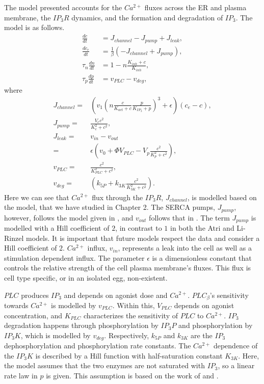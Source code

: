 The model presented accounts for the $Ca^{2+}$ fluxes across the ER and plasma membrane, the $IP_3R$ dynamics, and the formation and degradation of $IP_3$. The model is as follows.
\begin{align}
    \frac{dc}{dt}&=J_{channel}-J_{pump}+J_{leak},\\
    \frac{dc_e}{dt}&=\frac{1}{\beta}(-J_{channel}+J_{pump}),\\
    \tau_n\frac{dn}{dt}&=1-n\frac{K_{inh}+c}{K_{inh}},\\
    \tau_p\frac{dp}{dt}&=v_{PLC}-v_{deg},
\end{align}
where
\begin{align}
    J_{channel}=&\left(v_1\left(n\frac{c}{K_{act}+c}\frac{p}{K_{IP_3}+p}\right)^3+\epsilon\right)(c_e-c),\nonumber\\
    J_{pump}=&\frac{V_ec^2}{K_e^2+c^2},\nonumber\\
    J_{leak}=&v_{in}-v_{out}\nonumber\\
    =&\epsilon \left(v_0+\Phi V_{PLC}-V_{p}\frac{c^2}{K_{p}^2+c^2}\right),\nonumber\\
    v_{PLC}=&\frac{c^2}{K_{PLC}^2+c^2},\nonumber\\
    v_{deg}=&\left(k_{5P}+k_{3K}\frac{c^2}{K_{3K}^2+c^2}\right).\nonumber
\end{align}
Here we can see that $Ca^{2+}$ flux through the $IP_3R$, $J_{channel}$, is modelled based on the  model, that we have studied in Chapter 2. The SERCA pumps, $J_{pump}$, however, follows the model given in , and $v_{out}$ follows that in . The term $J_{pump}$ is modelled with a Hill coefficient of $2$, in contrast to $1$ in both the Atri and Li-Rinzel models. It is important that future models respect the data and consider a Hill coefficient of $2$. $Ca^{2+}$ influx, $v_{in}$, represents a leak into the cell as well as a stimulation dependent influx. The parameter $\epsilon$ is a dimensionless constant that controls the relative strength of the cell plasma membrane's fluxes. This flux is cell type specific, or in an isolated egg, non-existent.

$PLC$ produces $IP_3$ and depends on agonist dose and $Ca^{2+}$. $PLC_{\beta}$'s sensitivity towards $Ca^{2+}$ is modelled by $v_{PLC}$. Within this, $V_{PLC}$ depends on agonist concentration, and $K_{PLC}$ characterizes the sensitivity of $PLC$ to $Ca^{2+}$. $IP_3$ degradation happens through phosphorylation by $IP_3P$ and phosphorylation by $IP_3K$, which is modelled by $v_{deg}$. Respectively, $k_{5P}$ and $k_{3K}$ are the $IP_3$ dephosphorylation and phosphorylation rate constants. The $Ca^{2+}$ dependence of the $IP_3K$ is described by a Hill function with half-saturation constant $K_{3K}$. Here, the model assumes that the two enzymes are not saturated with $IP_3$, so a linear rate law in $p$ is given. This assumption is based on the work of  and .


